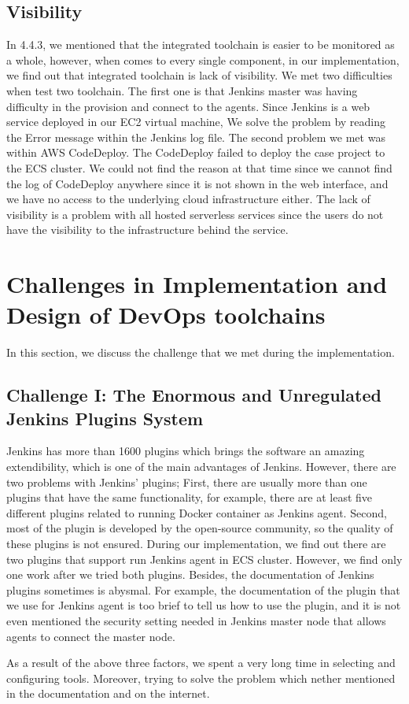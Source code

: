 \subsection{Visibility}
\label{visibility}
In 4.4.3, we mentioned that the integrated toolchain is easier to be monitored as a whole, however, when comes to every single component, in our implementation, we find out that integrated toolchain is lack of visibility. We met two difficulties when test two toolchain. The first one is that Jenkins master was having difficulty in the provision and connect to the agents. Since Jenkins is a web service deployed in our EC2 virtual machine, We solve the problem by reading the Error message within the Jenkins log file. The second problem we met was within AWS CodeDeploy. The CodeDeploy failed to deploy the case project to the ECS cluster. We could not find the reason at that time since we cannot find the log of CodeDeploy anywhere since it is not shown in the web interface, and we have no access to the underlying cloud infrastructure either. The lack of visibility is a problem with all hosted serverless services since the users do not have the visibility to the infrastructure behind the service.

\section{Challenges in Implementation and Design of DevOps toolchains}
In this section, we discuss the challenge that we met during the implementation. 
\subsection{Challenge I: The Enormous and Unregulated Jenkins Plugins System}
Jenkins has more than 1600 plugins which brings the software an amazing extendibility, which is one of the main advantages of Jenkins. However, there are two problems with Jenkins' plugins; First, there are usually more than one plugins that have the same functionality, for example, there are at least five different plugins related to running Docker container as Jenkins agent. Second, most of the plugin is developed by the open-source community, so the quality of these plugins is not ensured. During our implementation, we find out there are two plugins that support run Jenkins agent in ECS cluster. However, we find only one work after we tried both plugins. Besides, the documentation of Jenkins plugins sometimes is abysmal. For example, the documentation of the plugin that we use for Jenkins agent is too brief to tell us how to use the plugin, and it is not even mentioned the security setting needed in Jenkins master node that allows agents to connect the master node. 
\par
As a result of the above three factors, we spent a very long time in selecting and configuring tools. Moreover, trying to solve the problem which nether mentioned in the documentation and on the internet. 
